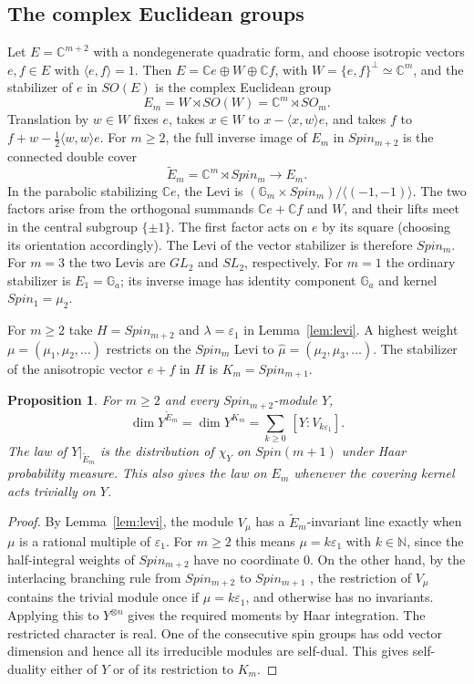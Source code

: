 \documentclass[11pt,reqno]{amsart}
\newtheorem{proposition}[theorem]{Proposition}
\theoremstyle{definition}
\newcommand{\CC}{\mathbb C}
\newcommand{\NN}{\mathbb N}
\newcommand{\Ga}{\mathbb G_a}
\newcommand{\Gm}{\mathbb G_m}
\begin{document}
\subsection{The complex Euclidean groups}\label{sec:euclidean}
Let $E=\CC^{m+2}$ with a nondegenerate quadratic form, and choose isotropic vectors $e,f\in E$ with $\langle e,f\rangle=1$. Then $E=\CC e\oplus W\oplus\CC f$, with $W=\{e,f\}^\perp\simeq\CC^m$, and the stabilizer of $e$ in $SO(E)$ is the complex Euclidean group
\[
   E_m=W\rtimes SO(W)=\CC^m\rtimes SO_m .
\]
Translation by $w\in W$ fixes $e$, takes $x\in W$ to $x-\langle x,w\rangle e$, and takes $f$ to $f+w-\tfrac12\langle w,w\rangle e$. For $m\ge2$, the full inverse image of $E_m$ in $Spin_{m+2}$ is the connected double cover
\[
        \widetilde E_m=\CC^m\rtimes Spin_m\longrightarrow E_m .
\]
In the parabolic stabilizing $\CC e$, the Levi is $(\Gm\times Spin_m)/\langle(-1,-1)\rangle$. The two factors arise from the orthogonal summands $\CC e+\CC f$ and $W$, and their lifts meet in the central subgroup $\{\pm1\}$. The first factor acts on $e$ by its square (choosing its orientation accordingly). The Levi of the vector stabilizer is therefore $Spin_m$. For $m=3$ the two Levis are $GL_2$ and $SL_2$, respectively. For $m=1$ the ordinary stabilizer is $E_1=\Ga$; its inverse image has identity component $\Ga$ and kernel $Spin_1=\mu_2$.

For $m\ge2$ take $H=Spin_{m+2}$ and $\lambda=\varepsilon_1$ in Lemma~\ref{lem:levi}. A highest weight $\mu=(\mu_1,\mu_2,\ldots)$ restricts on the $Spin_m$ Levi to $\hat\mu=(\mu_2,\mu_3,\ldots)$. The stabilizer of the anisotropic vector $e+f$ in $H$ is $K_m=Spin_{m+1}$.

\begin{proposition}\label{prop:spherical}
For $m\geq2$ and every $Spin_{m+2}$-module $Y$,
\[
   \dim Y^{\widetilde E_m}=\dim Y^{K_m}=\sum_{k\geq0}\,[Y:V_{k\varepsilon_1}] .
\]
The law of $Y|_{\widetilde E_m}$ is the distribution of $\chi_Y$ on $Spin(m+1)$ under Haar probability measure. This also gives the law on $E_m$ whenever the covering kernel acts trivially on $Y$.
\end{proposition}

\begin{proof}
By Lemma~\ref{lem:levi}, the module $V_\mu$ has a $\widetilde E_m$-invariant line exactly when $\mu$ is a rational multiple of $\varepsilon_1$. For $m\geq2$ this means $\mu=k\varepsilon_1$ with $k\in\NN$, since the half-integral weights of $Spin_{m+2}$ have no coordinate $0$. On the other hand, by the interlacing branching rule from $Spin_{m+2}$ to $Spin_{m+1}$ \cite{GW}, the restriction of $V_\mu$ contains the trivial module once if $\mu=k\varepsilon_1$, and otherwise has no invariants. Applying this to $Y^{\otimes n}$ gives the required moments by Haar integration. The restricted character is real. One of the consecutive spin groups has odd vector dimension and hence all its irreducible modules are self-dual. This gives self-duality either of $Y$ or of its restriction to $K_m$.
\end{proof}
\end{document}
